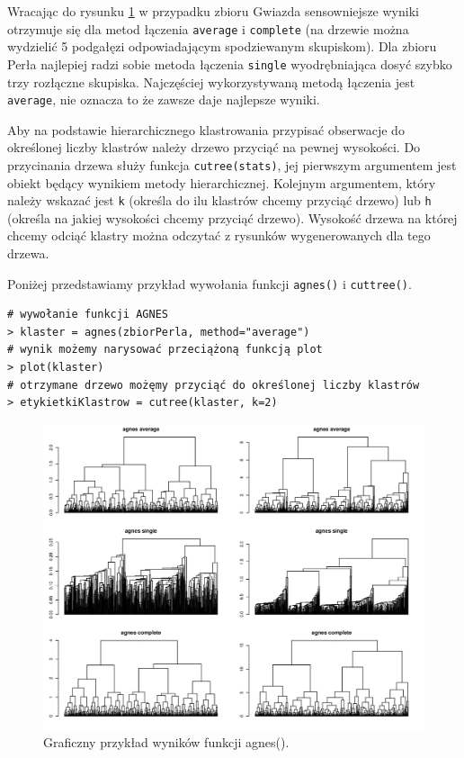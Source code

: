 \documentclass[polish,]{book}
\begin{document}
Wracając do rysunku \ref{fig:agnes} w przypadku zbioru Gwiazda sensowniejsze wyniki
otrzymuje się dla metod łączenia \texttt{average} i \texttt{complete} (na drzewie można wydzielić
5 podgałęzi odpowiadającym spodziewanym skupiskom). Dla zbioru Perła najlepiej
radzi sobie metoda łączenia \texttt{single} wyodrębniająca dosyć szybko trzy rozłączne
skupiska. Najczęściej wykorzystywaną metodą łączenia jest \texttt{average}, nie oznacza to że zawsze daje najlepsze wyniki.

Aby na podstawie hierarchicznego klastrowania przypisać obserwacje do określonej liczby klastrów należy drzewo przyciąć na pewnej wysokości. Do przycinania
drzewa służy funkcja \texttt{cutree(stats)}, jej pierwszym argumentem jest obiekt będący
wynikiem metody hierarchicznej. Kolejnym argumentem, który należy wskazać jest
\texttt{k} (określa do ilu klastrów chcemy przyciąć drzewo) lub \texttt{h} (określa na jakiej wysokości
chcemy przyciąć drzewo). Wysokość drzewa na której chcemy odciąć klastry można
odczytać z rysunków wygenerowanych dla tego drzewa.

Poniżej przedstawiamy przykład wywołania funkcji \texttt{agnes()} i \texttt{cuttree()}.

\begin{verbatim}
# wywołanie funkcji AGNES
> klaster = agnes(zbiorPerla, method="average")
# wynik możemy narysować przeciążoną funkcją plot
> plot(klaster)
# otrzymane drzewo możęmy przyciąć do określonej liczby klastrów
> etykietkiKlastrow = cutree(klaster, k=2)
\end{verbatim}

\begin{figure}

{\centering \includegraphics[width=1\linewidth]{agnes} 

}

\caption{Graficzny przykład wyników funkcji agnes().}\label{fig:agnes}
\end{figure}
\end{document}
